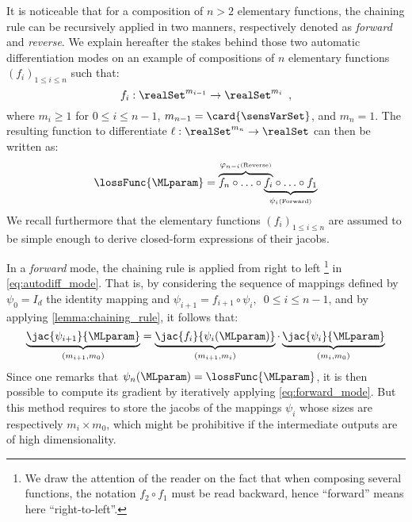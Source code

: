 It is noticeable that for a composition of \(n > 2\) elementary functions, the chaining rule can be recursively applied in two manners, respectively denoted as \emph{forward} and \emph{reverse}.
We explain hereafter the stakes behind those two automatic differentiation modes on an example of compositions of \(n\) elementary functions \((f_i)_{1 \leq i \leq n}\) such that:
\begin{equation}
	f_i: \realSet^{m_{i-1}} \rightarrow \realSet^{m_i} \enspace ,
\end{equation}
where \(m_i \geq 1\) for \(0 \leq i \leq n-1\), \(m_{n-1} = \card{\sensVarSet}\), and \(m_n = 1\).
The resulting function to differentiate \(\ell: \realSet^{m_n}\rightarrow \realSet\) can then be written as:
\begin{equation}
	\lossFunc{\MLparam} = 
	\lefteqn{\overbrace{\phantom{f_n \circ \ldots \circ f_i}}^{\varphi_{n-i} \mbox{\tiny (Reverse)}}}
	f_n \circ \ldots \circ 
	\underbrace{f_i \circ \ldots \circ f_1}_{\psi_i \mbox{\tiny (Forward)}}
	\label{eq:autodiff_mode}
\end{equation}
We recall furthermore that the elementary functions \((f_i)_{1 \leq i \leq n}\) are assumed to be simple enough to derive closed-form expressions of their \glspl{jacob}.

In a \emph{forward} mode, the chaining rule is applied from right to left%
\footnote{
	We draw the attention of the reader on the fact that when composing several functions, the notation \(f_2 \circ f_1\) must be read backward, hence ``forward'' means here ``right-to-left''.
} 
in \autoref{eq:autodiff_mode}.
That is, by considering the sequence of mappings defined by \(\psi_0 = I_d\) the identity mapping and \(\psi_{i+1} = f_{i+1} \circ \psi_i, \enspace 0 \leq i \leq n-1\), and by applying \autoref{lemma:chaining_rule}, it follows that:
\begin{equation}
	\underbrace{\jac{\psi_{i+1}}{\MLparam}}_{(m_{i+1}, m_0)} = \underbrace{\jac{f_i}{\psi_i(\MLparam)}}_{(m_{i+1}, m_i)} \cdot \underbrace{\jac{\psi_i}{\MLparam}}_{(m_i, m_0)}
	\label{eq:forward_mode}
\end{equation}
Since one remarks that \(\psi_n(\MLparam) = \lossFunc{\MLparam}\), it is then possible to compute its gradient by iteratively applying \autoref{eq:forward_mode}.
But this method requires to store the \glspl{jacob} of the mappings \(\psi_i\) whose sizes are respectively \(m_i \times m_0\), which might be prohibitive if the intermediate outputs are of high dimensionality.

